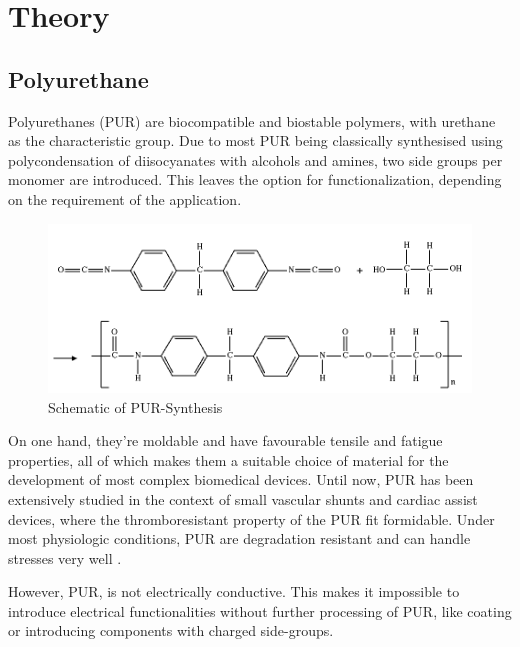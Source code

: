 \section{Theory}
\label{sec:Theory}



\subsection{Polyurethane}

Polyurethanes (PUR) are biocompatible and biostable polymers, with urethane as the characteristic group. Due to most PUR being classically synthesised using polycondensation of diisocyanates with alcohols and amines, two side groups per monomer are introduced. This leaves the option for functionalization, depending on the requirement of the application.

\begin{figure}[H]
\centerline{\includegraphics[scale=0.4]{./pic/Polyurethane.png}}
    \caption{Schematic of PUR-Synthesis}
    \label{fig:PURSynth}
\end{figure}

On one hand, they're moldable and have favourable tensile and fatigue properties, all of which makes them a suitable choice of material for the development of most complex biomedical devices. \cite{Pinchuk}
Until now, PUR has been extensively studied in the context of small vascular shunts and cardiac assist devices, where the thromboresistant property of the PUR fit formidable. Under most physiologic conditions, PUR are degradation resistant and can handle stresses very well \cite{Ulery}.

However, PUR, is not electrically conductive. This makes it impossible to introduce electrical functionalities without further processing of PUR, like coating or introducing components with charged side-groups.\cite{Guruthan, Zhu} 


